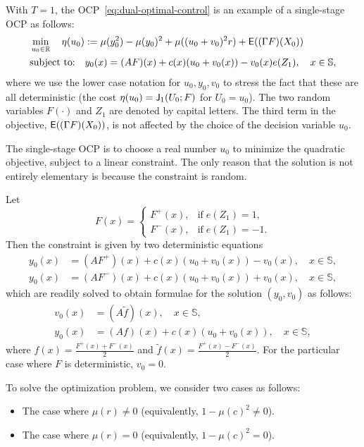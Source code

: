 \documentclass[twoside,11pt]{article}
\def\Re{\mathbb{R}}
\newcommand{\field}[1]{\mathbb{#1}}
\def\Re{\field{R}}
\def\E{{\sf E}}
\def\bS{\begin{slide}}
\def\Re{\mathbb{R}}
\def\E{{\sf E}}
\renewcommand{\Re}{\mathbb{R}}
\def\E{{\sf E}}
\def\bS{\mathbb{S}}
\def\sJ{{\sf J}}
\begin{document}
With $T=1$, the OCP~\eqref{eq:dual-optimal-control} is an example of a
single-stage OCP as follows:
\begin{align*}
&\min_{u_0\in\Re} \quad \eta(u_0):=\mu(y_0^2) - \mu(y_0)^2  + \mu((u_0+v_0)^2r) +
  \E((\Gamma F)(X_0)) \\
&\text{subject to:}\quad y_0(x) = (AF)(x) + c(x) (u_0 + v_0(x)) - v_0(x)e(Z_1),\quad x\in\bS,
\end{align*}
where we use the lower case notation for $u_0,y_0,v_0$ to stress the
fact that these are all deterministic (the cost
$\eta(u_0)=\sJ_1(U_0;F)$ for $U_0=u_0$).  The two random variables 
$F(\cdot)$ and $Z_1$ are denoted by capital letters. 
The third term in the objective, $\E((\Gamma F)(X_0))$, is
not affected by the choice of the decision variable $u_0$.

The single-stage OCP is to choose a real number $u_0$ to minimize
the quadratic objective, subject to a linear
constraint.  The only reason that the
solution is not entirely elementary is because the constraint is random.   

Let
\[
  F(x) = \begin{cases} F^+(x), & \text{if}\; e(Z_1)=1, \\
    F^-(x), & \text{if}\; e(Z_1)=-1. \end{cases}
\]
Then the constraint is given by two deterministic equations
\begin{align*}
  y_0(x) &= (AF^+)(x) + c(x) (u_0 + v_0(x)) - v_0(x) ,\quad x\in\bS,\\
  y_0(x) &= (AF^-)(x) + c(x) (u_0 + v_0(x))  + v_0(x) ,\quad x\in\bS,
\end{align*}
which are readily solved to obtain formulae for the solution $(y_0,v_0)$ as
follows:
\begin{align*}
  v_0(x) &= (A\tilde{f})(x), \quad x\in\bS,\\
  y_0(x) &= (Af)(x) + c(x) (u_0 + v_0(x)), \quad x\in\bS,
\end{align*}
where $f(x) = \frac{F^+(x)+F^-(x)}{2}$ and $\tilde f(x) =
\frac{F^+(x)-F^-(x)}{2}$. For the particular case where $F$ is
deterministic, $v_0=0$. 

 To solve the optimization problem, we consider two cases as follows:
\begin{itemize}
\item The case where $\mu(r)\neq 0$ (equivalently, $1-\mu(c)^2 \neq 0$).
\item The case where  $\mu(r) = 0$ (equivalently, $1-\mu(c)^2 = 0$). 
\end{itemize}
\end{document}
